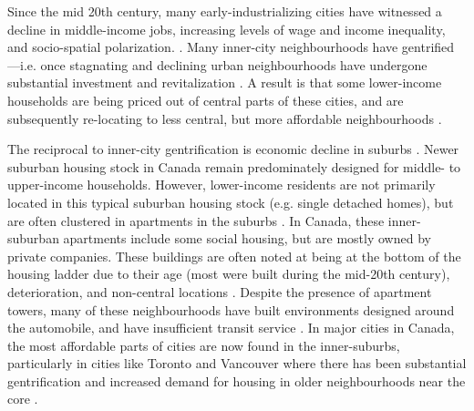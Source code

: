 


Since the mid 20th century, many early-industrializing cities have witnessed a decline in middle-income jobs, increasing levels of wage and income inequality, and socio-spatial polarization. \cite{glaeser_inequality_2009,walks_income_2013,grant_changing_2020}. Many inner-city neighbourhoods have gentrified---i.e. once stagnating and declining urban neighbourhoods have undergone substantial investment and revitalization \cite{lees_gentrification_2013}. A result is that some lower-income households are being priced out of central parts of these cities, and are subsequently re-locating to less central, but more affordable neighbourhoods \cite{atkinson_measuring_2000,lees_gentrification_2013,zuk_gentrification_2018}. 

The reciprocal to inner-city gentrification is economic decline in suburbs \cite{ehrenhalt_great_2012}. Newer suburban housing stock in Canada remain predominately designed for middle- to upper-income households. However, lower-income residents are not primarily located in this typical suburban housing stock (e.g. single detached homes), but are often clustered in apartments in the suburbs \cite{skaburskis_filtering_2014,cooke_suburbanization_2015}. In Canada, these inner-suburban apartments include some social housing, but are mostly owned by private companies. These buildings are often noted at being at the bottom of the housing ladder due to their age (most were built during the mid-20th century), deterioration, and non-central locations \cite{skaburskis_filtering_2014, august_gentrification_2018}. Despite the presence of apartment towers, many of these neighbourhoods have built environments designed around the automobile, and have insufficient transit service \cite{allen_sizing_2019}. In major cities in Canada, the most affordable parts of cities are now found in the inner-suburbs, particularly in cities like Toronto and Vancouver where there has been substantial gentrification and increased demand for housing in older neighbourhoods near the core \cite{ades_are_2012,walks_income_2013,breau_pulling_2018,grant_changing_2020}. 





